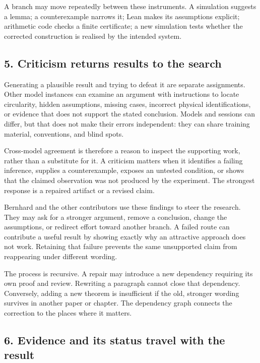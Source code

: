 \documentclass[
  11pt,
]{article}
\begin{document}
A branch may move repeatedly between these instruments. A simulation
suggests a lemma; a counterexample narrows it; Lean makes its
assumptions explicit; arithmetic code checks a finite certificate; a new
simulation tests whether the corrected construction is realised by the
intended system.

\subsection{5. Criticism returns results to the
search}\label{criticism-returns-results-to-the-search}

Generating a plausible result and trying to defeat it are separate
assignments. Other model instances can examine an argument with
instructions to locate circularity, hidden assumptions, missing cases,
incorrect physical identifications, or evidence that does not support
the stated conclusion. Models and sessions can differ, but that does not
make their errors independent: they can share training material,
conventions, and blind spots.

Cross-model agreement is therefore a reason to inspect the supporting
work, rather than a substitute for it. A criticism matters when it
identifies a failing inference, supplies a counterexample, exposes an
untested condition, or shows that the claimed observation was not
produced by the experiment. The strongest response is a repaired
artifact or a revised claim.

Bernhard and the other contributors use these findings to steer the
research. They may ask for a stronger argument, remove a conclusion,
change the assumptions, or redirect effort toward another branch. A
failed route can contribute a useful result by showing exactly why
an attractive approach does not work. Retaining that failure prevents
the same unsupported claim from reappearing under different wording.

The process is recursive. A repair may introduce a new dependency
requiring its own proof and review. Rewriting a paragraph cannot close
that dependency. Conversely, adding a new theorem is insufficient if the
old, stronger wording survives in another paper or chapter. The
dependency graph connects the correction to the places where it matters.

\subsection{6. Evidence and its status travel with the
result}\label{evidence-and-its-status-travel-with-the-result}
\end{document}
